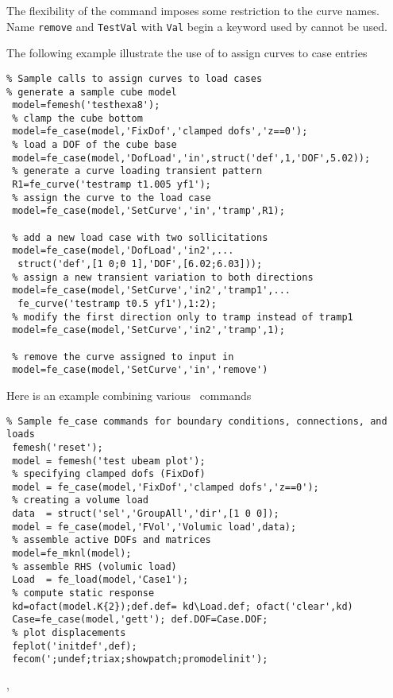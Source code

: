\vs The flexibility of the command imposes some restriction to the curve names. Name {\tt remove} and {\tt TestVal} with {\tt Val} begin a keyword used by  cannot be used.

\vs

The following example illustrate the use of  to assign curves to case entries

\begin{verbatim}
% Sample calls to assign curves to load cases
% generate a sample cube model
 model=femesh('testhexa8'); 
 % clamp the cube bottom
 model=fe_case(model,'FixDof','clamped dofs','z==0');
 % load a DOF of the cube base
 model=fe_case(model,'DofLoad','in',struct('def',1,'DOF',5.02));
 % generate a curve loading transient pattern
 R1=fe_curve('testramp t1.005 yf1');
 % assign the curve to the load case
 model=fe_case(model,'SetCurve','in','tramp',R1);
 
 % add a new load case with two sollicitations
 model=fe_case(model,'DofLoad','in2',...
  struct('def',[1 0;0 1],'DOF',[6.02;6.03]));
 % assign a new transient variation to both directions
 model=fe_case(model,'SetCurve','in2','tramp1',...
  fe_curve('testramp t0.5 yf1'),1:2);
 % modify the first direction only to tramp instead of tramp1
 model=fe_case(model,'SetCurve','in2','tramp',1);
 
 % remove the curve assigned to input in
 model=fe_case(model,'SetCurve','in','remove')
\end{verbatim}%



Here is an example combining various \fecase\ commands

\begin{verbatim}
% Sample fe_case commands for boundary conditions, connections, and loads
 femesh('reset');
 model = femesh('test ubeam plot');
 % specifying clamped dofs (FixDof) 
 model = fe_case(model,'FixDof','clamped dofs','z==0');
 % creating a volume load
 data  = struct('sel','GroupAll','dir',[1 0 0]);
 model = fe_case(model,'FVol','Volumic load',data);
 % assemble active DOFs and matrices
 model=fe_mknl(model);
 % assemble RHS (volumic load)
 Load  = fe_load(model,'Case1');
 % compute static response
 kd=ofact(model.K{2});def.def= kd\Load.def; ofact('clear',kd)
 Case=fe_case(model,'gett'); def.DOF=Case.DOF;
 % plot displacements
 feplot('initdef',def);
 fecom(';undef;triax;showpatch;promodelinit');
\end{verbatim}%


\noindent \femk, \fecase








